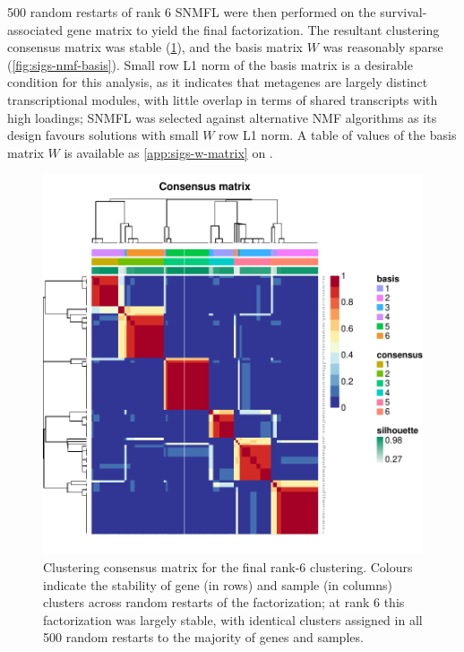 \documentclass[dissertation.tex]{subfiles}
\begin{document}
500 random restarts of rank 6 \gls{SNMFL} were then performed on the survival-associated gene matrix to yield the final factorization.  The resultant clustering consensus matrix was stable (\cref{fig:sigs-nmf-consensus}), and the basis matrix $W$ was reasonably sparse (\cref{fig:sigs-nmf-basis}).  Small row L1 norm of the basis matrix is a desirable condition for this analysis, as it indicates that metagenes are largely distinct transcriptional modules, with little overlap in terms of shared transcripts with high loadings; \gls{SNMFL} was selected against alternative \gls{NMF} algorithms as its design favours solutions with small $W$ row L1 norm.  A table of values of the basis matrix $W$ is available as \cref{app:sigs-w-matrix} on .

\begin{figure}
\centering
\includegraphics[width=.7\linewidth]{analysis/biosurv/reports/18_SIS_diag_dsd_final/figure/nmf-plots-1}
\caption{Clustering consensus matrix for the final rank-6 clustering.  Colours indicate the stability of gene (in rows) and sample (in columns) clusters across random restarts of the factorization; at rank 6 this factorization was largely stable, with identical clusters assigned in all 500 random restarts to the majority of genes and samples.\label{fig:sigs-nmf-consensus}}
\end{figure}
\end{document}
